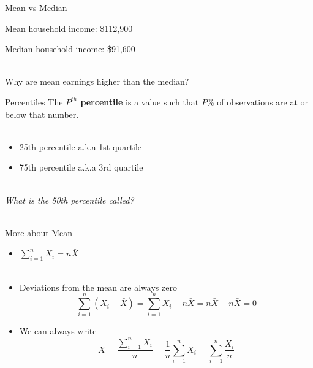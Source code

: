 \documentclass{./../div_teaching_slides}
\begin{document}
\begin{frame}{Mean vs Median}
\begin{witemize}
\item Mean household income: \$112,900
\item Median household income: \$91,600 \\~\\
\end{witemize} 
Why are mean earnings higher than the median?
\end{frame}

\begin{frame}{Percentiles}
The \textbf{$P^{th}$ percentile} is a value such that $P$\% of observations are at or below that number. \\~\\
\begin{itemize}
\item [] 25th percentile a.k.a 1st quartile
\item [] 75th percentile a.k.a 3rd quartile \\~\\
\end{itemize}
\textit{What is the 50th percentile called?} \\~\\
\end{frame}

\begin{frame}{More about Mean}
\vspace{0.5em}
\begin{itemize}
\item $\sum_{i=1}^n X_i = n \bar{X}$ \\~\\ \pause
\item Deviations from the mean are always zero
$$ \sum_{i=1}^n (X_i-\bar{X}) =  \sum_{i=1}^n X_i - n \bar{X} = n \bar{X}- n \bar{X}=0 $$ \pause
\item We can always write
$$ \bar{X} = \frac {\sum_{i=1}^n X_i}{n} = \frac{1}{n}\sum_{i=1}^n X_i = \sum_{i=1}^n \frac{X_i}{n} $$
\end{itemize}
\end{frame}
\end{document}
